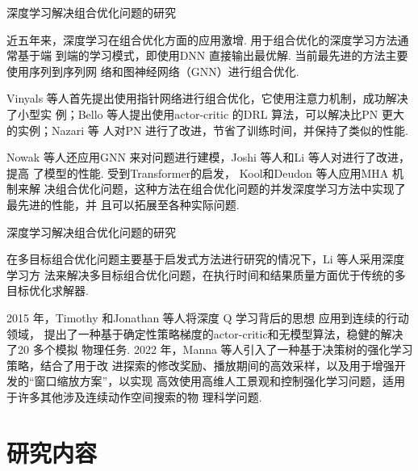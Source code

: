 \documentclass[12pt,aspectratio=169]{beamer}
\begin{document}
\begin{frame}{深度学习解决组合优化问题的研究}

  近五年来，深度学习在组合优化方面的应用激增. 用于组合优化的深度学习方法通常基于端
  到端的学习模式，即使用DNN 直接输出最优解. 当前最先进的方法主要使用序列到序列网
  络\cite{sutskever2014sequence}和图神经网络（GNN）\cite{scarselli2008graph}进行组合优化. 

  Vinyals 等人首先提出使用指针网络进行组合优化，它使用注意力机制，成功解决了小型实
  例；Bello 等人\cite{bello2016neural}提出使用actor-critic 的DRL 算法，可以解决比PN 更大的实例；Nazari 等
  人对PN 进行了改进，节省了训练时间，并保持了类似的性能. 

  Nowak 等人\cite{nowak2017note}还应用GNN 来对问题进行建模，Joshi 等人和Li 等人对\parencite{nowak2017note}进行了改进，提高
  了模型的性能. 受到Transformer\cite{ashish2017attention}的启发，
  Kool\cite{kool2018attention}和Deudon 等人\cite{deudon2018learning}应用MHA 机制来解
  决组合优化问题，这种方法在组合优化问题的并发深度学习方法中实现了最先进的性能，并
  且可以拓展至各种实际问题. 

\end{frame}

\begin{frame}{深度学习解决组合优化问题的研究}

  在多目标组合优化问题主要基于启发式方法进行研究的情况下，Li 等人\cite{li2020deep}采用深度学习方
  法来解决{\color{ECNURed}多目标组合优化问题}，在执行时间和结果质量方面优于传统的多目标优化求解器. 

  2015 年，Timothy 和Jonathan 等人\cite{lillicrap2015continuous}将{\color{ECNURed}深度 Q 学习}背后的思想
  应用到{\color{ECNURed}连续的行动领域}，
  提出了一种基于确定性策略梯度的actor-critic和无模型算法，稳健的解决了20 多个模拟
  物理任务. 2022 年，Manna 等人\cite{manna2022learning}引入了一种基于{\color{ECNURed}决策树}的强化学习策略，结合了用于改
  进探索的修改奖励、播放期间的高效采样，以及用于增强开发的“窗口缩放方案”，以实现
  高效使用高维人工景观和控制强化学习问题，适用于许多其他涉及连续动作空间搜索的物
  理科学问题. 

\end{frame}

\section{研究内容}
\end{document}
